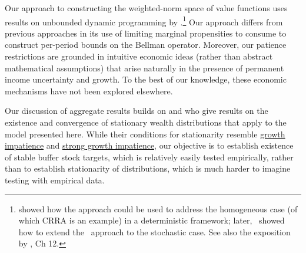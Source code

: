\documentclass[BufferStockTheory]{subfiles}
\begin{document}
Our approach to constructing the weighted-norm space of value functions uses results on unbounded dynamic programming by \citep{jboydWeighted}.\footnote{\cite{asHomogeneous} showed how the approach could be used to address the homogeneous case (of which CRRA is an example) in a deterministic framework; later,~\cite{duranDiscounting} showed how to extend the~\cite{jboydWeighted} approach to the stochastic case.
  See also the exposition by \cite{stachurski2022}, Ch 12.} Our approach differs from previous approaches in its use of limiting marginal propensities to consume to construct per-period bounds on the Bellman operator.
Moreover, our patience restrictions are grounded in intuitive economic ideas (rather than abstract mathematical assumptions) that arise naturally in the presence of permanent income uncertainty and growth.
To the best of our knowledge, these economic mechanisms have not been explored elsewhere.

Our discussion of aggregate results builds on \cite{szeidlInvariant} and \cite{harmenbergInvariant} who give results on the existence and convergence of stationary wealth distributions that apply to the model presented here.
While their conditions for stationarity resemble \hyperlink{GIC}{growth impatience} and \hyperlink{GICMod}{strong growth impatience,} our objective is to establish existence of stable buffer stock targets, which is relatively easily tested empirically, rather than to establish stationarity of distributions, which is much harder to imagine testing with empirical data.


\ifSubfilesClassLoaded{ 
    
  }{}
\end{document}
